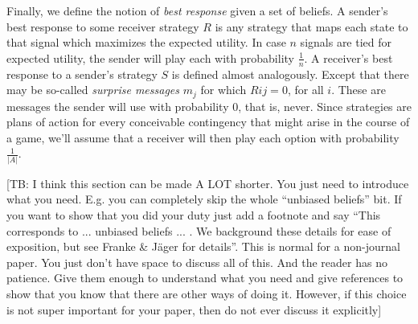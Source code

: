 \documentclass[10pt]{article}
\newcommand{\tb}[1]{\textcolor[rgb]{.8,.33,.0}{[TB: #1]}}%
\begin{document}
Finally, we define the notion of \textit{best response} given a set of beliefs. A sender's best response to some receiver strategy $R$ is any strategy that maps each state to that signal which maximizes the expected utility. In case $n$ signals are tied for expected utility, the sender will play each with probability $\tfrac{1}{n}$.
A receiver's best response to a sender's strategy $S$ is defined almost analogously. Except that there may be so-called \textit{surprise messages} $m_j$ for which $R{ij}=0$, for all $i$. These are messages the sender will use with probability 0, that is, never. Since strategies are plans of action for every conceivable contingency that might arise in the course of a game, we'll assume that a receiver will then play each option with probability $\tfrac{1}{|A|}$.

\tb{I think this section can be made A LOT shorter. You just need to introduce what you need. E.g. you can completely skip the whole ``unbiased beliefs'' bit. If you want to show that you did your duty just add a footnote and say ``This corresponds to ... unbiased beliefs ... . We background these details for ease of exposition, but see Franke \& J\"ager for details''. This is normal for a non-journal paper. You just don't have space to discuss all of this. And the reader has no patience. Give them enough to understand what you need and give references to show that you know that there are other ways of doing it. However, if this choice is not super important for your paper, then do not ever discuss it explicitly}
\end{document}
